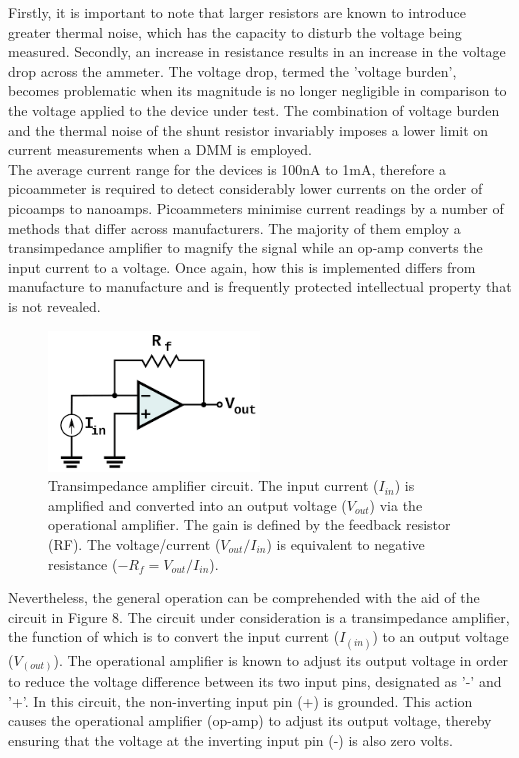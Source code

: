 \noindent Firstly, it is important to note that larger resistors are known to introduce greater thermal noise, which has the capacity to disturb the voltage being measured. Secondly, an increase in resistance results in an increase in the voltage drop across the ammeter. The voltage drop, termed the 'voltage burden', becomes problematic when its magnitude is no longer negligible in comparison to the voltage applied to the device under test. The combination of voltage burden and the thermal noise of the shunt resistor invariably imposes a lower limit on current measurements when a DMM is employed. \\

\noindent The average current range for the devices is 100nA to 1mA, therefore a picoammeter is required to detect considerably lower currents on the order of picoamps to nanoamps. Picoammeters minimise current readings by a number of methods that differ across manufacturers. The majority of them employ a transimpedance amplifier to magnify the signal while an op-amp converts the input current to a voltage. Once again, how this is implemented differs from manufacture to manufacture and is frequently protected intellectual property that is not revealed. \\

\begin{figure}[htbp!] 
    \centering    
    \includegraphics[width=0.5\textwidth]{Chapter3/Figs/e.png}
    \caption[Transimpedance amplifier circuit.]{Transimpedance amplifier circuit. The input current ($I_{in}$) is amplified and converted into an output voltage ($V_{out}$) via the operational amplifier. The gain is defined by the feedback resistor (RF). The voltage/current ($V_{out}/I_{in}$) is equivalent to negative resistance ($-R_f = V_{out} / I_{in}$).}
    \label{fig:3e}
\end{figure}

\noindent Nevertheless, the general operation can be comprehended with the aid of the circuit in Figure 8. The circuit under consideration is a transimpedance amplifier, the function of which is to convert the input current ($I_(in)$) to an output voltage ($V_(out)$). The operational amplifier is known to adjust its output voltage in order to reduce the voltage difference between its two input pins, designated as '-' and '+'. In this circuit, the non-inverting input pin (+) is grounded. This action causes the operational amplifier (op-amp) to adjust its output voltage, thereby ensuring that the voltage at the inverting input pin (-) is also zero volts. \\

